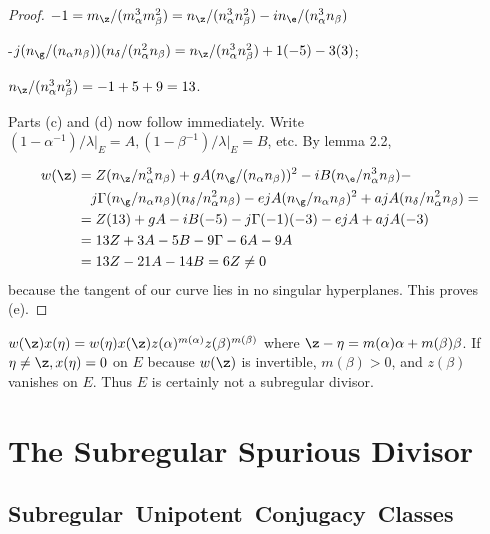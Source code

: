 \documentclass{memo-l}
\theoremstyle{definition}
\theoremstyle{remark}
\numberwithin{section}{chapter}
\numberwithin{equation}{chapter}
\begin{document}
\begin{proof}
\noindent
$-1 =   m_{{\z}}/(m_{\alpha}^{3}m_{\beta}^{2}) =
n_{{\z}}/(n_{\alpha}^{3}n_{\beta}^{2}) -
in_{{\e}}/(n_{\alpha}^{3}n_{\beta})$

-$j(n_{{\g}}/(n_{\alpha}n_{\beta}))
(n_{{\delta}}/(n_{\alpha}^{2}n_{\beta}) =
n_{{\z}}/(n_{\alpha}^{3}n_{\beta}^{2}) + 1(-5) -3(3)$;

$n_{{\z}}/(n_{\alpha}^{3}n_{\beta}^{2}) = -1+5+9 = 13$.

\medskip

\noindent
Parts (c) and (d) now follow immediately.
 Write $(1-{\alpha}^{-1})/{\lambda} \vert_{E} = A,
(1-{\beta}^{-1})/{\lambda} \vert_{E} = B$, etc.
 By lemma 2.2,

\medskip

$$
\aligned
w({\z}) &=  Z(n_{{\z}}/n_{\alpha}^{3}n_{\beta}) +
gA(n_{{\g}}/(n_{\alpha}n_{\beta}))^{2} -
iB(n_{{\e}}/n_{\alpha}^{3}n_{\beta}) - \\
&\quad j{\Gamma}(n_{{\g}}/n_{\alpha}n_{\beta})(n_{{\delta}}/n_{\alpha}^{2}
n_{\beta}) - ejA(n_{{\g}}/n_{\alpha}n_{\beta})^{2} +
ajA(n_{{\delta}}/n_{\alpha}^{2}n_{\beta}) = \\
&= Z(13) + gA -iB(-5) -j{\Gamma}(-1)(-3) -ejA +ajA(-3) \\
&= 13Z + 3A -5B -9{\Gamma} -6A -9A \\
&= 13Z -21A -14B = 6Z \ne 0
\endaligned
$$
because the tangent of our curve lies in no singular hyperplanes.
This proves (e).
\end{proof}

\medpagebreak

\noindent
$w({\z})x({\eta}) = w({\eta})x({\z})z({\alpha})^{m({\alpha})}
z({\beta})^{m({\beta})}$ where ${\z}-{\eta} =
m({\alpha}){\alpha}+m({\beta}){\beta}$.
 If ${\eta}\ne {\z}, x({\eta}) = 0$ on $E$ because $w({\z})$ is
invertible, $m({\beta}) > 0$, and $z({\beta})$ vanishes on $E$.
 Thus $E$ is certainly not a subregular divisor.




\chapter{The Subregular Spurious Divisor}




\section{Subregular\ Unipotent\ Conjugacy\ Classes}
\end{document}
